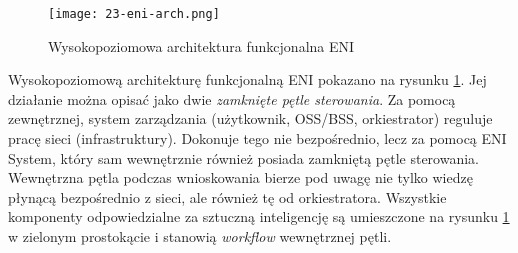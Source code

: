 \begin{figure}[!h]
    \centering \texttt{[image: 23-eni-arch.png]}
    \caption{Wysokopoziomowa architektura funkcjonalna ENI}\label{fig:23-eni-arch}
\end{figure}

Wysokopoziomową architekturę funkcjonalną ENI pokazano na rysunku \ref{fig:23-eni-arch}. Jej działanie można opisać jako dwie \textit{zamknięte pętle sterowania}. Za pomocą zewnętrznej, system zarządzania (użytkownik, OSS/BSS, orkiestrator) reguluje pracę sieci (infrastruktury). Dokonuje tego nie bezpośrednio, lecz za pomocą ENI System, który sam wewnętrznie również posiada zamkniętą pętle sterowania. Wewnętrzna pętla podczas wnioskowania bierze pod uwagę nie tylko wiedzę płynącą bezpośrednio z sieci, ale również tę od orkiestratora. Wszystkie komponenty odpowiedzialne za sztuczną inteligencję są umieszczone na rysunku \ref{fig:23-eni-arch} w zielonym prostokącie i stanowią \textit{workflow} wewnętrznej pętli. 